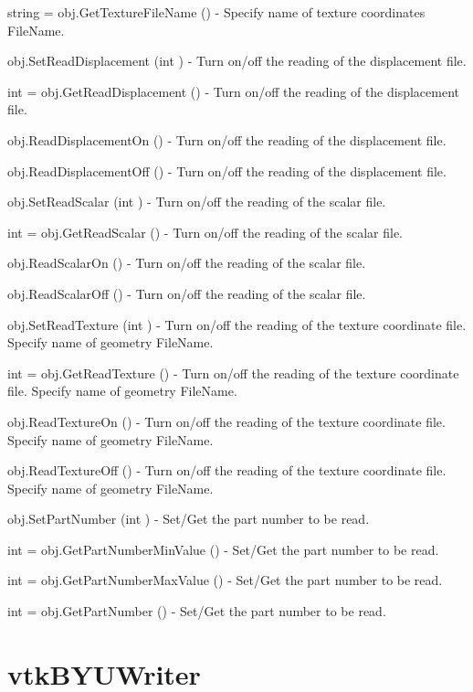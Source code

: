 \begin{DoxyItemize}
\item {\ttfamily string = obj.\-Get\-Texture\-File\-Name ()} -\/ Specify name of texture coordinates File\-Name.  
\item {\ttfamily obj.\-Set\-Read\-Displacement (int )} -\/ Turn on/off the reading of the displacement file.  
\item {\ttfamily int = obj.\-Get\-Read\-Displacement ()} -\/ Turn on/off the reading of the displacement file.  
\item {\ttfamily obj.\-Read\-Displacement\-On ()} -\/ Turn on/off the reading of the displacement file.  
\item {\ttfamily obj.\-Read\-Displacement\-Off ()} -\/ Turn on/off the reading of the displacement file.  
\item {\ttfamily obj.\-Set\-Read\-Scalar (int )} -\/ Turn on/off the reading of the scalar file.  
\item {\ttfamily int = obj.\-Get\-Read\-Scalar ()} -\/ Turn on/off the reading of the scalar file.  
\item {\ttfamily obj.\-Read\-Scalar\-On ()} -\/ Turn on/off the reading of the scalar file.  
\item {\ttfamily obj.\-Read\-Scalar\-Off ()} -\/ Turn on/off the reading of the scalar file.  
\item {\ttfamily obj.\-Set\-Read\-Texture (int )} -\/ Turn on/off the reading of the texture coordinate file. Specify name of geometry File\-Name.  
\item {\ttfamily int = obj.\-Get\-Read\-Texture ()} -\/ Turn on/off the reading of the texture coordinate file. Specify name of geometry File\-Name.  
\item {\ttfamily obj.\-Read\-Texture\-On ()} -\/ Turn on/off the reading of the texture coordinate file. Specify name of geometry File\-Name.  
\item {\ttfamily obj.\-Read\-Texture\-Off ()} -\/ Turn on/off the reading of the texture coordinate file. Specify name of geometry File\-Name.  
\item {\ttfamily obj.\-Set\-Part\-Number (int )} -\/ Set/\-Get the part number to be read.  
\item {\ttfamily int = obj.\-Get\-Part\-Number\-Min\-Value ()} -\/ Set/\-Get the part number to be read.  
\item {\ttfamily int = obj.\-Get\-Part\-Number\-Max\-Value ()} -\/ Set/\-Get the part number to be read.  
\item {\ttfamily int = obj.\-Get\-Part\-Number ()} -\/ Set/\-Get the part number to be read.  
\end{DoxyItemize}\hypertarget{vtkio_vtkbyuwriter}{}\section{vtk\-B\-Y\-U\-Writer}\label{vtkio_vtkbyuwriter}
